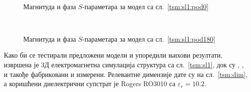 \documentclass[main.tex]{subfiles}
\begin{document}
\begin{figure}[!t]
\centering
{}\\
\caption{Магнитуда и фаза $S$-параметара за модел са сл.~\ref{tsm:sl1:pod0}}
\label{tsm:rez1c:pod0}
\end{figure}
\begin{figure}[!t]
\centering
{}\\
\caption{Магнитуда и фаза $S$-параметара за модел са сл.~\ref{tsm:sl1:pod180}}
\label{tsm:rez1c:pod180}
\end{figure}
Како би се тестирали предложени модели и упоредили њихови резултати, извршена је 3Д електромагнетна симулација структура са сл.~\ref{tsm:sl1}, док су , ,  и  такође фабриковани и измерени. Релевантне димензије дате су на сл.~\ref{tsm:dim}, а коришћени диелектрични супстрат је Rogers RO3010 са $\varepsilon_r = \num{10.2}$. 
\end{document}
